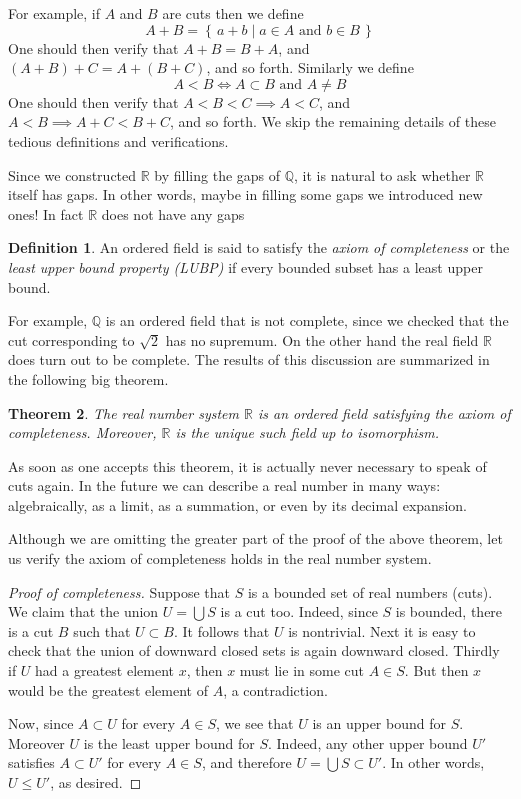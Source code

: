 \documentclass[11pt,oneside]{amsbook}
\newcommand{\set}[1]{\left\{\,#1\,\right\}}
\newcommand{\QQ}{\mathbb Q}
\newcommand{\RR}{\mathbb R}
\theoremstyle{definition}
\theoremstyle{plain}
\newtheorem{thm}{Theorem}[section]
\theoremstyle{definition}
\newtheorem{defn}[thm]{Definition}
\theoremstyle{remark}
\numberwithin{equation}{section}
\numberwithin{figure}{section}
\begin{document}
For example, if $A$ and $B$ are cuts then we define
\[A+B=\set{a+b\mid a\in A\text{ and }b\in B}
\]
One should then verify that $A+B=B+A$, and $(A+B)+C=A+(B+C)$, and so forth. Similarly we define
\[A<B\iff A\subset B\text{ and }A\neq B
\]
One should then verify that $A<B<C\implies A<C$, and $A<B\implies A+C<B+C$, and so forth. We skip the remaining details of these tedious definitions and verifications.

Since we constructed $\RR$ by filling the gaps of $\QQ$, it is natural to ask whether $\RR$ itself has gaps. In other words, maybe in filling some gaps we introduced new ones! In fact $\RR$ does not have any gaps

\begin{defn}
  An ordered field is said to satisfy the \emph{axiom of completeness} or the \emph{least upper bound property (LUBP)} if every bounded subset has a least upper bound.
\end{defn}

For example, $\QQ$ is an ordered field that is not complete, since we checked that the cut corresponding to $\sqrt2$ has no supremum. On the other hand the real field $\RR$ does turn out to be complete. The results of this discussion are summarized in the following big theorem.

\begin{thm}
  The real number system $\RR$ is an ordered field satisfying the axiom of completeness. Moreover, $\RR$ is the unique such field up to isomorphism.
\end{thm}

As soon as one accepts this theorem, it is actually never necessary to speak of cuts again. In the future we can describe a real number in many ways: algebraically, as a limit, as a summation, or even by its decimal expansion.

Although we are omitting the greater part of the proof of the above theorem, let us verify the axiom of completeness holds in the real number system.

\begin{proof}[Proof of completeness]
  Suppose that $S$ is a bounded set of real numbers (cuts). We claim that the union $U=\bigcup S$ is a cut too. Indeed, since $S$ is bounded, there is a cut $B$ such that  $U\subset B$. It follows that $U$ is nontrivial. Next it is easy to check that the union of downward closed sets is again downward closed. Thirdly if $U$ had a greatest element $x$, then $x$ must lie in some cut $A\in S$. But then $x$ would be the greatest element of $A$, a contradiction.

  Now, since $A\subset U$ for every $A\in S$, we see that $U$ is an upper bound for $S$. Moreover $U$ is the least upper bound for $S$. Indeed, any other upper bound $U'$ satisfies $A\subset U'$ for every $A\in S$, and therefore $U=\bigcup S\subset U'$. In other words, $U\leq U'$, as desired.
\end{proof}
\end{document}
